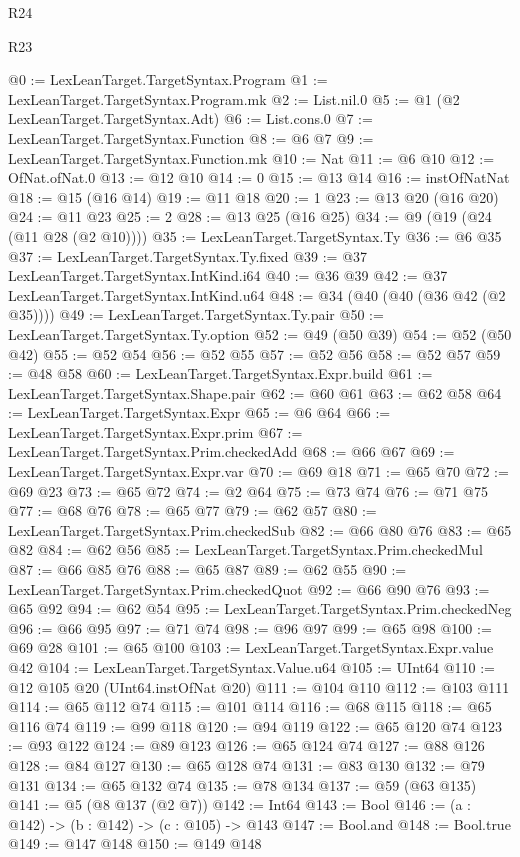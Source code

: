 \begin{lexlean}{R24}
\begin{lexlean}{R23}
\begin{coremodule}
{{{{{@0 := LexLeanTarget.TargetSyntax.Program
@1 := LexLeanTarget.TargetSyntax.Program.mk
@2 := List.nil.{0}
@5 := @1 (@2 LexLeanTarget.TargetSyntax.Adt)
@6 := List.cons.{0}
@7 := LexLeanTarget.TargetSyntax.Function
@8 := @6 @7
@9 := LexLeanTarget.TargetSyntax.Function.mk
@10 := Nat
@11 := @6 @10
@12 := OfNat.ofNat.{0}
@13 := @12 @10
@14 := 0
@15 := @13 @14
@16 := instOfNatNat
@18 := @15 (@16 @14)
@19 := @11 @18
@20 := 1
@23 := @13 @20 (@16 @20)
@24 := @11 @23
@25 := 2
@28 := @13 @25 (@16 @25)
@34 := @9 (@19 (@24 (@11 @28 (@2 @10))))
@35 := LexLeanTarget.TargetSyntax.Ty
@36 := @6 @35
@37 := LexLeanTarget.TargetSyntax.Ty.fixed
@39 := @37 LexLeanTarget.TargetSyntax.IntKind.i64
@40 := @36 @39
@42 := @37 LexLeanTarget.TargetSyntax.IntKind.u64
@48 := @34 (@40 (@40 (@36 @42 (@2 @35))))
@49 := LexLeanTarget.TargetSyntax.Ty.pair
@50 := LexLeanTarget.TargetSyntax.Ty.option
@52 := @49 (@50 @39)
@54 := @52 (@50 @42)
@55 := @52 @54
@56 := @52 @55
@57 := @52 @56
@58 := @52 @57
@59 := @48 @58
@60 := LexLeanTarget.TargetSyntax.Expr.build
@61 := LexLeanTarget.TargetSyntax.Shape.pair
@62 := @60 @61
@63 := @62 @58
@64 := LexLeanTarget.TargetSyntax.Expr
@65 := @6 @64
@66 := LexLeanTarget.TargetSyntax.Expr.prim
@67 := LexLeanTarget.TargetSyntax.Prim.checkedAdd
@68 := @66 @67
@69 := LexLeanTarget.TargetSyntax.Expr.var
@70 := @69 @18
@71 := @65 @70
@72 := @69 @23
@73 := @65 @72
@74 := @2 @64
@75 := @73 @74
@76 := @71 @75
@77 := @68 @76
@78 := @65 @77
@79 := @62 @57
@80 := LexLeanTarget.TargetSyntax.Prim.checkedSub
@82 := @66 @80 @76
@83 := @65 @82
@84 := @62 @56
@85 := LexLeanTarget.TargetSyntax.Prim.checkedMul
@87 := @66 @85 @76
@88 := @65 @87
@89 := @62 @55
@90 := LexLeanTarget.TargetSyntax.Prim.checkedQuot
@92 := @66 @90 @76
@93 := @65 @92
@94 := @62 @54
@95 := LexLeanTarget.TargetSyntax.Prim.checkedNeg
@96 := @66 @95
@97 := @71 @74
@98 := @96 @97
@99 := @65 @98
@100 := @69 @28
@101 := @65 @100
@103 := LexLeanTarget.TargetSyntax.Expr.value @42
@104 := LexLeanTarget.TargetSyntax.Value.u64
@105 := UInt64
@110 := @12 @105 @20 (UInt64.instOfNat @20)
@111 := @104 @110
@112 := @103 @111
@114 := @65 @112 @74
@115 := @101 @114
@116 := @68 @115
@118 := @65 @116 @74
@119 := @99 @118
@120 := @94 @119
@122 := @65 @120 @74
@123 := @93 @122
@124 := @89 @123
@126 := @65 @124 @74
@127 := @88 @126
@128 := @84 @127
@130 := @65 @128 @74
@131 := @83 @130
@132 := @79 @131
@134 := @65 @132 @74
@135 := @78 @134
@137 := @59 (@63 @135)
@141 := @5 (@8 @137 (@2 @7))
@142 := Int64
@143 := Bool
@146 := (a : @142) -> (b : @142) -> (c : @105) -> @143
@147 := Bool.and
@148 := Bool.true
@149 := @147 @148
@150 := @149 @148
}}}}}
\end{coremodule}
\end{lexlean}
\end{lexlean}
